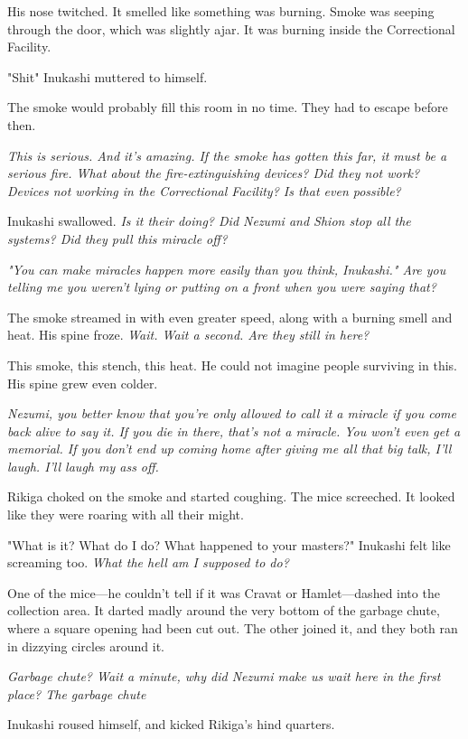 His nose twitched. It smelled like something was burning. Smoke was
seeping through the door, which was slightly ajar. It was burning inside
the Correctional Facility.

"Shit\el " Inukashi muttered to himself.

The smoke would probably fill this room in no time. They had to escape
before then.

\emph{This is serious. And it's amazing. If the smoke has gotten this far, it
must be a serious fire. What about the fire-extinguishing devices? Did
they not work? Devices not working in the Correctional Facility? Is that
even possible?}

Inukashi swallowed. \emph{Is it their doing? Did Nezumi and Shion stop all the
systems? Did they pull this miracle off?}

\emph{"You can make miracles happen more easily than you think, Inukashi." Are
you telling me you weren't lying or putting on a front when you were
saying that?}

The smoke streamed in with even greater speed, along with a burning
smell and heat. His spine froze. \emph{Wait. Wait a second. Are they still in
here?}

This smoke, this stench, this heat. He could not imagine people
surviving in this. His spine grew even colder.

\emph{Nezumi, you better know that you're only allowed to call it a miracle if
you come back alive to say it. If you die in there, that's not a
miracle. You won't even get a memorial. If you don't end up coming home
after giving me all that big talk, I'll laugh. I'll laugh my ass off.}

Rikiga choked on the smoke and started coughing. The mice screeched. It
looked like they were roaring with all their might.

"What is it? What do I do? What happened to your masters?" Inukashi felt
like screaming too. \emph{What the hell am I supposed to do?}

One of the mice---he couldn't tell if it was Cravat or Hamlet---dashed into
the collection area. It darted madly around the very bottom of the
garbage chute, where a square opening had been cut out. The other joined
it, and they both ran in dizzying circles around it.

\emph{Garbage chute? Wait a minute, why did Nezumi make us wait here in the
first place? The garbage chute\el }

Inukashi roused himself, and kicked Rikiga's hind quarters.

